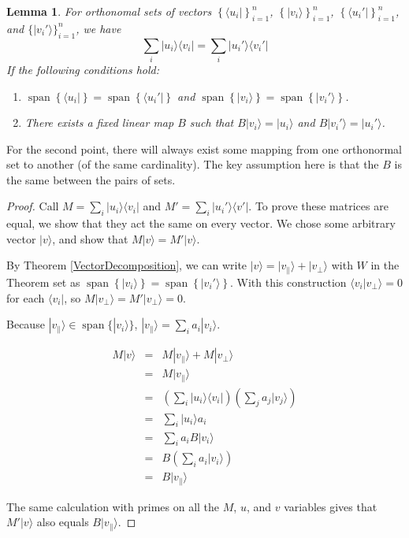 \documentclass{amsbook}
\newtheorem{lemma}[theorem]{Lemma}
\begin{document}
\begin{lemma}
\label{RebaseProjections}
For orthonomal sets of vectors $\left\{\langle u_i|\right\}_{i=1}^n$, $\left\{|v_i\rangle\right\}_{i=1}^n$, $\left\{\langle u_i'|\right\}_{i=1}^n$, and $\{|v_i'\rangle\}_{i=1}^n$, we have
$$
\sum_i|u_i\rangle\langle v_i|=\sum_i|u_i'\rangle\langle v_i'|
$$
If the following conditions hold:
\begin{enumerate}
\item $\operatorname{span}\left\{\langle u_i|\right\}=\operatorname{span}\left\{\langle u_i'|\right\}$ and $\operatorname{span}\left\{|v_i\rangle\right\}=\operatorname{span}\left\{|v_i'\rangle\right\}$.
\item There exists a fixed linear map $B$ such that $B|v_i\rangle=|u_i\rangle$ and $B|v_i'\rangle=|u_i'\rangle$.
\end{enumerate}
\end{lemma}

For the second point, there will always exist some mapping from one orthonormal set to another (of the same cardinality).  The key assumption here is that the $B$ is the same between the pairs of sets.

\begin{proof}
Call $M=\sum_i|u_i\rangle\langle v_i|$ and $M'=\sum_i|u_i'\rangle\langle v'|$.  To prove these matrices are equal, we show that they act the same on every vector.  We chose some arbitrary vector $|v\rangle$, and show that $M|v\rangle=M'|v\rangle$.

By Theorem \ref{VectorDecomposition}, we can write $|v\rangle=|v_\parallel\rangle+|v_\bot\rangle$ with $W$ in the Theorem set as $\operatorname{span}\left\{|v_i\rangle\right\}=\operatorname{span}\left\{|v_i'\rangle\right\}$.  With this construction $\langle v_i|v_\bot\rangle=0$ for each $\langle v_i|$, so $M|v_\bot\rangle=M'|v_\bot\rangle=0$.

Because $|v_\parallel\rangle\in\operatorname{span}\{|v_i\rangle\}$, $|v_\parallel\rangle=\sum_ia_i|v_i\rangle$.

$$
\begin{array}{rcl}
M|v\rangle &=& M|v_\parallel\rangle+M|v_\bot\rangle \\
 &=& M|v_\parallel\rangle \\
 &=& \left(\sum_i|u_i\rangle\langle v_i|\right)\left(\sum_ja_j|v_j\rangle\right) \\
 &=& \sum_i|u_i\rangle a_i \\
 &=& \sum_ia_iB|v_i\rangle \\
 &=& B\left(\sum_ia_i|v_i\rangle\right) \\
 &=& B|v_\parallel\rangle
\end{array}
$$

The same calculation with primes on all the $M$, $u$, and $v$ variables gives that $M'|v\rangle$ also equals $B|v_\parallel\rangle$.  
\end{proof}
\end{document}
